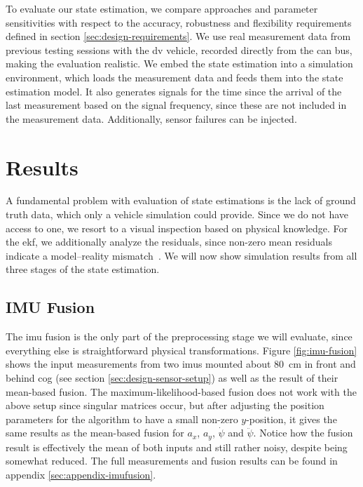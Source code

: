To evaluate our state estimation, we compare approaches and parameter sensitivities with respect to the accuracy, robustness and flexibility requirements defined in section \ref{sec:design-requirements}. We use real measurement data from previous testing sessions with the \gls{dv} vehicle, recorded directly from the \gls{can} bus, making the evaluation realistic. We embed the state estimation into a simulation environment, which loads the measurement data and feeds them into the state estimation model. It also generates signals for the time since the arrival of the last measurement based on the signal frequency, since these are not included in the measurement data. Additionally, sensor failures can be injected.


\section{Results}
A fundamental problem with evaluation of state estimations is the lack of ground truth data, which only a vehicle simulation could provide. Since we do not have access to one, we resort to a visual inspection based on physical knowledge. For the \gls{ekf}, we additionally analyze the residuals, since non-zero mean residuals indicate a model--reality mismatch~\cite[p.~158]{AlexanderWischnewski.2019}. We will now show simulation results from all three stages of the state estimation.


\subsection{IMU Fusion}
The \gls{imu} fusion is the only part of the preprocessing stage we will evaluate, since everything else is straightforward physical transformations. Figure \ref{fig:imu-fusion} shows the input measurements from two \glspl{imu} mounted about \SI{80}{\centi\meter} in front and behind \gls{cog} (see section \ref{sec:design-sensor-setup}) as well as the result of their mean-based fusion. The maximum-likelihood-based fusion does not work with the above setup since singular matrices occur, but after adjusting the position parameters for the algorithm to have a small non-zero $y$-position, it gives the same results as the mean-based fusion for $a_x$, $a_y$, $\dot{\psi}$ and $\ddot{\psi}$. Notice how the fusion result is effectively the mean of both inputs and still rather noisy, despite being somewhat reduced. The full measurements and fusion results can be found in appendix \ref{sec:appendix-imufusion}.

